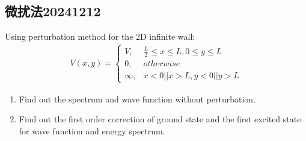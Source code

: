\documentclass{article}
\begin{document}
\subsection{微扰法20241212}
Using perturbation method for the 2D infinite wall:
\begin{align*}
    V(x,y)=
    \begin{cases}
        V,&\frac{L}{2}\leq x \leq L,0\leq y\leq L\\
        0,&otherwise\\
        \infty,&x<0||x>L,y<0||y>L
    \end{cases}
\end{align*}
\begin{enumerate}
    \item  Find out the spectrum and wave function without perturbation.
    \item Find out the first order correction of ground state and the first excited state for wave function and energy spectrum.
\end{enumerate}
\end{document}
